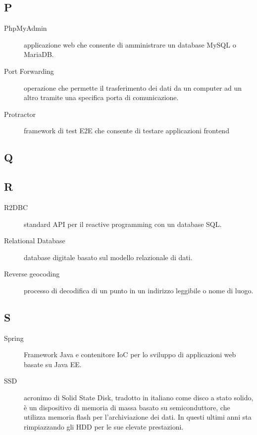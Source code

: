 \documentclass[../manuale-manutentore.tex]{subfiles}
\begin{document}
\subsection{P}

\begin{description}
    \item[PhpMyAdmin] applicazione web che consente di amministrare un database MySQL o MariaDB\@.
    \item[Port Forwarding] operazione che permette il trasferimento dei dati da un computer ad un altro tramite una specifica porta di comunicazione.
    \item[Protractor] framework di test E2E che consente di testare applicazioni frontend
\end{description}

\subsection{Q}

\subsection{R}

\begin{description}
    \item[R2DBC] standard API per il reactive programming con un database SQL\@.
    \item[Relational Database] database digitale basato sul modello relazionale di dati.
    \item[Reverse geocoding] processo di decodifica di un punto in un indirizzo leggibile o nome di luogo.
\end{description}

\subsection{S}

\begin{description}
    \item[Spring] Framework Java e contenitore IoC per lo sviluppo di applicazioni web basate su Java EE\@.
    \item[SSD] acronimo di Solid State Disk, tradotto in italiano come disco a stato solido, è un dispositivo di memoria di massa basato su semiconduttore, che utilizza memoria flash per l'archiviazione dei dati. In questi ultimi anni sta rimpiazzando gli HDD per le sue elevate prestazioni.
\end{description}
\end{document}
